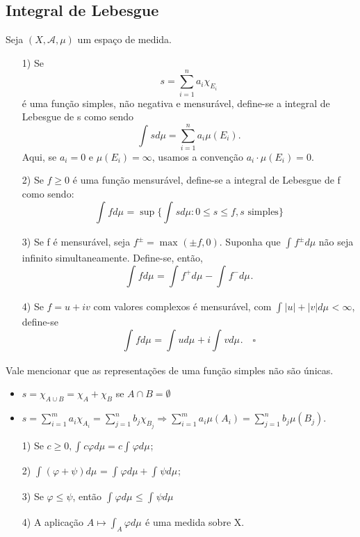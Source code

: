 \documentclass[measure_theory.tex]{subfiles}
\begin{document}
\subsection{Integral de Lebesgue}
\begin{def*}
	Seja \((X, \mathcal{A}, \mu )\) um espaço de medida.
	\begin{itemize}
		\item[1)] Se
		      \[
			      s=\sum\limits_{i=1}^{n}a_{i}\chi_{E_{i}}
		      \]
		      é uma função simples, não negativa e mensurável, define-se a integral de Lebesgue de s como sendo
		      \[
			      \int_{}^{}sd\mu = \sum\limits_{i=1}^{n}a_{i}\mu (E_{i}).
		      \]
		      Aqui, se \(a_{i} = 0\) e \(\mu (E_{i}) = \infty\), usamos a convenção \(a_{i}\cdot \mu (E_{i}) =0.\)
		\item[2)] Se \(f\geq 0\) é uma função mensurável, define-se a integral de Lebesgue de f como sendo:
		      \[
			      \int_{}f d\mu_{} = \sup_{}\biggl\{\int_{}^{}s d\mu : 0 \leq s\leq f, s \text{ simples}\biggr\}
		      \]
		\item[3)] Se f é mensurável, seja \(f^{\pm} = \max_{}(\pm f, 0)\). Suponha que \(\int_{}^{}f^{\pm}d\mu \) não seja infinito simultaneamente. Define-se, então,
		      \[
			      \int_{}f d\mu_{} = \int_{}f^{+} d\mu_{} - \int_{}f^{-} d\mu_{}.
		      \]
		\item[4)] Se \(f = u + iv\) com valores complexos é mensurável, com \(\int_{}|u|+|v| d\mu_{} < \infty\), define-se
		      \[
			      \int_{}f d\mu_{} = \int_{}u d\mu_{} + i\int_{}v d\mu_{}. \quad \square
		      \]
	\end{itemize}
\end{def*}
Vale mencionar que as representações de uma função simples não são únicas.
\begin{itemize}
	\item \(s = \chi_{A\cup B} = \chi_{A} + \chi_{B}\) se \(A\cap B = \emptyset \)
	\item \(s = \sum\limits_{i=1}^{m}a_{i}\chi_{A_{i}} = \sum\limits_{j=1}^{n}b_{j}\chi_{B_{j}} \Rightarrow \sum\limits_{i=1}^{m}a_{i}\mu (A_{i}) = \sum\limits_{j=1}^{n}b_{j}\mu (B_{j})\).
\end{itemize}
\begin{prop*}
	\begin{itemize}
		\item[1)] Se \(c\geq 0, \int_{}^{}c\varphi d\mu  = c\int_{}\varphi  d\mu_{}\);
		\item[2)] \(\int_{}(\varphi + \psi) d\mu_{} = \int_{}^{}\varphi d\mu + \int_{}\psi d\mu_{}\);
		\item[3)] Se \(\varphi \leq \psi\), então \(\int_{}\varphi  d\mu_{} \leq \int_{}\psi d\mu_{}\)
		\item[4)] A aplicação \(A\mapsto \int_{A}\varphi  d\mu_{}\) é uma medida sobre X.
	\end{itemize}
\end{prop*}
\end{document}
